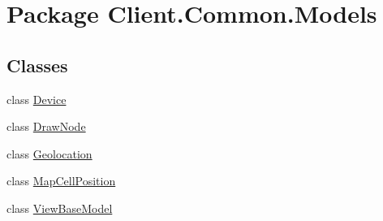 \hypertarget{namespaceClient_1_1Common_1_1Models}{\section{Package Client.\-Common.\-Models}
\label{namespaceClient_1_1Common_1_1Models}
}
\subsection*{Classes}
\begin{DoxyCompactItemize}
\item 
class \hyperlink{classClient_1_1Common_1_1Models_1_1Device}{Device}
\item 
class \hyperlink{classClient_1_1Common_1_1Models_1_1DrawNode}{Draw\-Node}
\item 
class \hyperlink{classClient_1_1Common_1_1Models_1_1Geolocation}{Geolocation}
\item 
class \hyperlink{classClient_1_1Common_1_1Models_1_1MapCellPosition}{Map\-Cell\-Position}
\item 
class \hyperlink{classClient_1_1Common_1_1Models_1_1ViewBaseModel}{View\-Base\-Model}
\end{DoxyCompactItemize}
